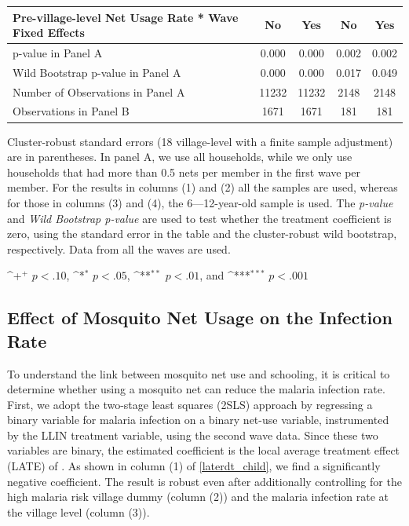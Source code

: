 \documentclass[fleqn,11pt]{article}
\newcommand{\sym}[1]{\rlap{$#1$}}
\def\sym#1{\ifmmode^{#1}\else\(^{#1}\)\fi
}
\begin{document}
\begin{table}[h]
\begin{adjustbox}{max width=\textwidth}
\begin{threeparttable}
\begin{tabular}{l*{4}{c}}
Pre-village-level Net Usage Rate * Wave Fixed Effects&          No         &         Yes         &          No         &         Yes         \\
\hline
p-value in Panel A    &       0.000         &       0.000         &       0.002         &       0.002         \\
Wild Bootstrap p-value  in Panel A &       0.000         &       0.000         &       0.017         &       0.049         \\
Number of Observations   in Panel A        &       11232         &       11232         &        2148         &        2148         \\
Observations in Panel B        &        1671         &        1671         &         181         &         181         \\
\hline\hline
\end{tabular}
\begin{tablenotes}
\item Cluster-robust standard errors (18 village-level with a finite sample adjustment) are in parentheses. In panel A, we use all households, while we only use households that had more than 0.5 nets per member in the first wave per member. For the results in columns (1) and (2) all the samples are used, whereas for those in columns (3) and (4), the 6—12-year-old sample is used. The \textit{p-value} and \textit{Wild Bootstrap p-value} are used to test whether the treatment coefficient is zero, using the standard error in the table and the cluster-robust wild bootstrap, respectively. Data from all the waves are used.
\item \sym{+} \(p<.10\), \sym{*} \(p<.05\), \sym{**} \(p<.01\), and \sym{***} \(p<.001\)
\end{tablenotes}
\end{threeparttable}
\end{adjustbox}
\end{table}
\subsection{Effect of Mosquito Net Usage on the Infection Rate}

To understand the link between mosquito net use and schooling, it
is critical to determine whether using a mosquito net can reduce the malaria infection
rate. First, we adopt the two-stage least squares (2SLS) approach by regressing a binary variable for malaria infection on a binary net-use variable, instrumented by the LLIN treatment variable, using the second wave data. Since these two variables are binary, the estimated coefficient is the local average treatment effect (LATE) of \cite{angrist_two-stage_1995}. As shown in column (1) of \autoref{laterdt_child}, we find a significantly negative coefficient. The result is robust even after additionally controlling for the high malaria risk village dummy (column (2)) and the malaria infection rate at the village level (column (3)).
\end{document}
